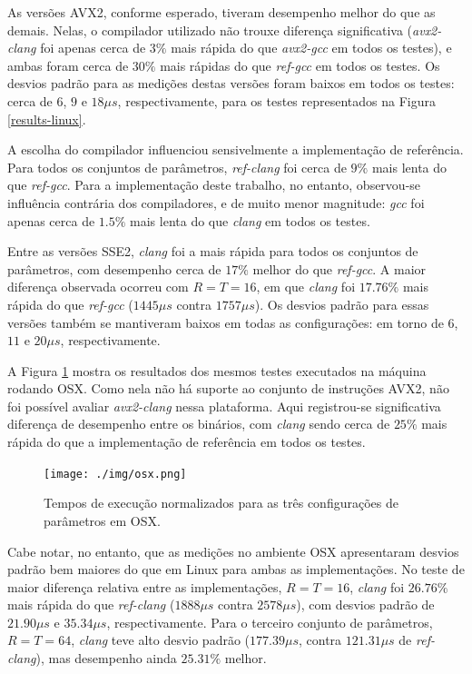\documentclass{article}
\begin{document}
As versões AVX2, conforme esperado, tiveram desempenho melhor do que as
demais. Nelas, o compilador utilizado não trouxe diferença significativa
(\emph{avx2-clang} foi apenas cerca de $3\%$ mais rápida do que
\emph{avx2-gcc} em todos os testes), e ambas foram cerca de $30\%$
mais rápidas do que \emph{ref-gcc} em todos os testes. Os desvios padrão
para as medições destas versões foram baixos em todos os testes: cerca de $6$,
$9$ e $18 \mu s$, respectivamente, para os testes representados na Figura
\ref{results-linux}.

A escolha do compilador influenciou sensivelmente a implementação de
referência. Para todos os conjuntos de parâmetros, \emph{ref-clang} foi cerca
de $9\%$ mais lenta do que \emph{ref-gcc}. Para a implementação deste trabalho,
no entanto, observou-se influência contrária dos compiladores, e de muito menor
magnitude: \emph{gcc} foi apenas cerca de $1.5\%$ mais lenta do que \emph{clang}
em todos os testes.

Entre as versões SSE2, \emph{clang} foi a mais rápida para todos os conjuntos
de parâmetros, com desempenho cerca de $17\%$ melhor do que \emph{ref-gcc}. A
maior diferença observada ocorreu com $R = T = 16$, em que \emph{clang} foi
$17.76\%$ mais rápida do que \emph{ref-gcc} ($1445 \mu s$ contra $1757 \mu s$).
Os desvios padrão para essas versões também se mantiveram baixos em todas as
configurações: em torno de $6$, $11$ e $20 \mu s$, respectivamente.

A Figura \ref{results-osx} mostra os resultados dos mesmos testes
executados na máquina rodando OSX. Como nela não há suporte ao conjunto
de instruções AVX2, não foi possível avaliar \emph{avx2-clang} nessa
plataforma. Aqui registrou-se significativa diferença de desempenho entre os
binários, com \emph{clang} sendo cerca de $25\%$ mais rápida do que a
implementação de referência em todos os testes.

\begin{figure}[htbp]
\centering
\texttt{[image: ./img/osx.png]}
\caption{Tempos de execução normalizados para as três configurações de
parâmetros em OSX\label{results-osx}.}
\end{figure}

Cabe notar, no entanto, que as medições no ambiente OSX apresentaram desvios
padrão bem maiores do que em Linux para ambas as implementações. No teste de
maior diferença relativa entre as implementações, $R = T = 16$, \emph{clang} foi
$26.76\%$ mais rápida do que \emph{ref-clang} ($1888 \mu s$ contra $2578 \mu
s$), com desvios padrão de $21.90 \mu s$ e $35.34 \mu s$, respectivamente. Para
o terceiro conjunto de parâmetros, $R = T = 64$, \emph{clang} teve alto desvio
padrão ($177.39 \mu s$, contra $121.31 \mu s$ de \emph{ref-clang}), mas
desempenho ainda $25.31\%$ melhor.
\end{document}
